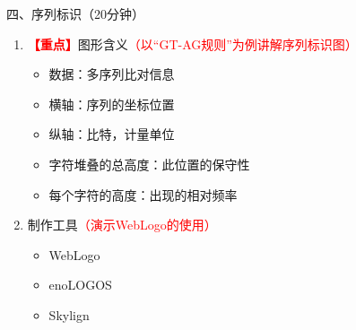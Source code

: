 \documentclass{TIJMUjiaoanLL}
\begin{document}
\vspace*{0.2cm}
\noindent
四、序列标识（20分钟）
\begin{enumerate}
  \item \textcolor{red}{\textbf{【重点】}}图形含义\textcolor{red}{（以“GT-AG规则”为例讲解序列标识图）}
    \begin{itemize}
      \item 数据：多序列比对信息
      \item 横轴：序列的坐标位置
      \item 纵轴：比特，计量单位
      \item 字符堆叠的总高度：此位置的保守性
      \item 每个字符的高度：出现的相对频率
    \end{itemize}
  \item 制作工具\textcolor{red}{（演示WebLogo的使用）}
    \begin{itemize}
      \item WebLogo
      \item enoLOGOS
      \item Skylign
    \end{itemize}
\end{enumerate}
\end{document}
